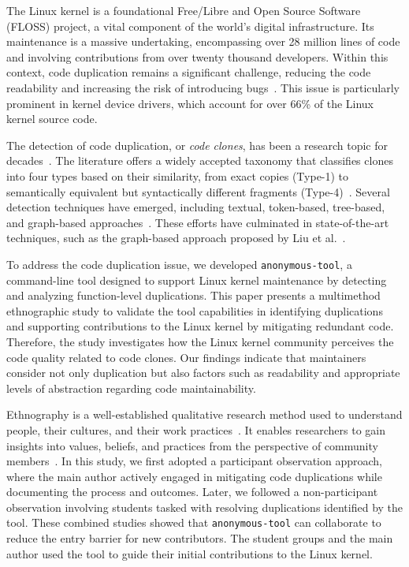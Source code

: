 \documentclass[12pt]{article}
\begin{document}
The Linux kernel is a foundational Free/Libre and Open Source Software (FLOSS) project, a vital component of the world's digital infrastructure. Its maintenance is a massive undertaking, encompassing over 28 million lines of code and involving contributions from over twenty thousand developers. Within this context, code duplication remains a significant challenge,  reducing the code readability and increasing the risk of introducing bugs~\cite{harmone,harmtwo}. This issue is particularly prominent in kernel device drivers, which account for over 66\% of the Linux kernel source code.

The detection of code duplication, or \textit{code clones}, has been a research topic for decades~\cite{firstman}. The literature offers a widely accepted taxonomy that classifies clones into four types based on their similarity, from exact copies (Type-1) to semantically equivalent but syntactically different fragments (Type-4)~\cite{litreview}. Several detection techniques have emerged, including textual, token-based, tree-based, and graph-based approaches~\cite{litreview}. These efforts have culminated in state-of-the-art techniques, such as the graph-based approach proposed by Liu et al.~\cite{tailor}.

To address the code duplication issue, we developed \texttt{anonymous-tool}, a command-line tool designed to support Linux kernel maintenance by detecting and analyzing function-level duplications. This paper presents a multimethod ethnographic study to validate the tool capabilities in identifying duplications and supporting contributions to the Linux kernel by mitigating redundant code. Therefore, the study investigates how the Linux kernel community perceives the code quality related to code clones. Our findings indicate that maintainers consider not only duplication but also factors such as readability and appropriate levels of abstraction regarding code maintainability.

Ethnography is a well-established qualitative research method used to understand people, their cultures, and their work practices~\cite{bookethno}. It enables researchers to gain insights into values, beliefs, and practices from the perspective of community members~\cite{ethnosoft}.  
In this study, we first adopted a participant observation approach, where the main author actively engaged in mitigating code duplications while documenting the process and outcomes. Later, we followed a non-participant observation involving students tasked with resolving duplications identified by the tool. These combined studies showed that \texttt{anonymous-tool} can collaborate to reduce the entry barrier for new contributors. The student groups and the main author used the tool to guide their initial contributions to the Linux kernel.
\end{document}
